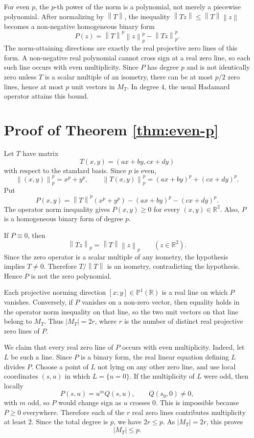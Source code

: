 \documentclass[11pt]{amsart}
\newcommand{\R}{\mathbb R}
\newcommand{\norm}[1]{\left\lVert #1\right\rVert}
\newcommand{\MT}{M_T}
\begin{document}
For even \(p\), the \(p\)-th power of the norm is a polynomial, not merely a
piecewise polynomial.  After normalizing by \(\norm{T}\), the inequality
\(\norm{Tz}\le \norm{T}\norm{z}\) becomes a non-negative homogeneous binary
form
\[
  P(z)=\norm{T}^p\norm{z}_p^p-\norm{Tz}_p^p .
\]
The norm-attaining directions are exactly the real projective zero lines of
this form.  A non-negative real polynomial cannot cross sign at a real zero
line, so each such line occurs with even multiplicity.  Since \(P\) has degree
\(p\) and is not identically zero unless \(T\) is a scalar multiple of an
isometry, there can be at most \(p/2\) zero lines, hence at most \(p\) unit
vectors in \(\MT\).  In degree \(4\), the usual Hadamard operator attains this
bound.

\section*{Proof of Theorem \ref{thm:even-p}}

Let \(T\) have matrix
\[
  T(x,y)=(ax+by,cx+dy)
\]
with respect to the standard basis.  Since \(p\) is even,
\[
  \norm{(x,y)}_p^p=x^p+y^p,
  \qquad
  \norm{T(x,y)}_p^p=(ax+by)^p+(cx+dy)^p .
\]
Put
\[
  P(x,y)=\norm{T}^p(x^p+y^p)-(ax+by)^p-(cx+dy)^p .
\]
The operator norm inequality gives \(P(x,y)\ge 0\) for every \((x,y)\in\R^2\).
Also, \(P\) is a homogeneous binary form of degree \(p\).

If \(P\equiv 0\), then
\[
  \norm{Tz}_p=\norm{T}\norm{z}_p\qquad(z\in\R^2).
\]
Since the zero operator is a scalar multiple of any isometry, the hypothesis
implies \(T\ne0\).  Therefore \(T/\norm{T}\) is an isometry, contradicting the
hypothesis.  Hence \(P\) is not the zero polynomial.

Each projective norming direction \([x:y]\in\mathbb P^1(\R)\) is a real line
on which \(P\) vanishes.  Conversely, if \(P\) vanishes on a non-zero vector,
then equality holds in the operator norm inequality on that line, so the two
unit vectors on that line belong to \(\MT\).  Thus \(|\MT|=2r\), where \(r\)
is the number of distinct real projective zero lines of \(P\).

We claim that every real zero line of \(P\) occurs with even multiplicity.
Indeed, let \(L\) be such a line.  Since \(P\) is a binary form, the real
linear equation defining \(L\) divides \(P\).  Choose a point of \(L\) not
lying on any other zero line, and use local coordinates \((s,u)\) in which
\(L=\{u=0\}\).  If the multiplicity of \(L\) were odd, then locally
\[
  P(s,u)=u^m Q(s,u),\qquad Q(s_0,0)\ne 0,
\]
with \(m\) odd, so \(P\) would change sign as \(u\) crosses \(0\).  This is
impossible because \(P\ge 0\) everywhere.  Therefore each of the \(r\) real
zero lines contributes multiplicity at least \(2\).  Since the total degree is
\(p\), we have \(2r\le p\).  As \(|\MT|=2r\), this proves
\[
  |\MT|\le p .
\]
\end{document}
